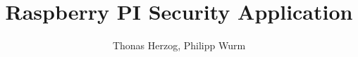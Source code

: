 \documentclass[]{article}
\title{Raspberry PI Security Application}
\author{Thonas Herzog, Philipp Wurm}
\begin{document}
\maketitle

\begin{abstract}
\end{abstract}







\end{document}
